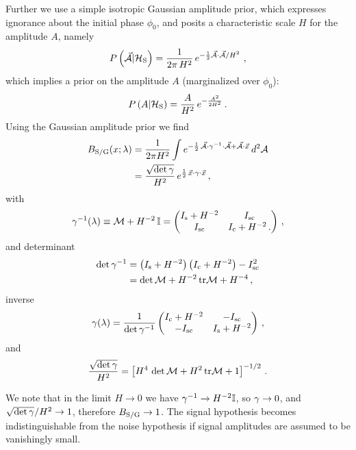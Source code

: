 \documentclass[aps,prd,onecolumn,notitlepage,nofootinbib,superscriptaddress,altaffilletter,floatfix]{revtex4-1}
\begin{document}
Further we use a simple isotropic Gaussian amplitude prior, which expresses ignorance about the initial phase $\phi_0$, and posits a characteristic
scale $H$ for the amplitude $A$, namely
\begin{equation}
  \label{eq:22}
  P\left(\vec{\mathcal{A}}|\mathcal{H}_{\mathrm{S}}\right) = \frac{1}{2\pi\,H^2}\,e^{-\frac{1}{2}{\vec{\mathcal{A}}\cdot\vec{\mathcal{A}}}/H^2}\,\,,
\end{equation}
which implies a prior on the amplitude $A$ (marginalized over $\phi_0$):
\begin{equation}
  \label{eq:28}
  P\left(A|\mathcal{H}_{\mathrm{S}}\right) = \frac{A}{H^2}\,e^{-\frac{A^2}{2H^2}}\,.
\end{equation}
Using the Gaussian amplitude prior we find
\begin{align}
  \label{eq:29}
  B_{\mathrm{S/G}}(x;\lambda) &= \frac{1}{2\pi H^2}\int e^{-\frac{1}{2}\,\vec{\mathcal{A}}\cdot\gamma^{-1}\cdot\vec{\mathcal{A}} + \vec{\mathcal{A}}\cdot\vec{x}}\,d^2\mathcal{A}\\
  &= \frac{\sqrt{\det\gamma}}{H^2}\, e^{\frac{1}{2}\,\vec{x}\cdot\gamma\cdot\vec{x}}\,,
\end{align}
with
\begin{equation}
  \label{eq:25}
  \gamma^{-1}(\lambda) \equiv \mathcal{M} + H^{-2}\,\mathbb{I} =
  \begin{pmatrix}
    I_{\mathrm{s}} + H^{-2} & I_{\mathrm{sc}} \\
    I_{\mathrm{sc}}        & I_{\mathrm{c}} + H^{-2}\,.
  \end{pmatrix}\,,
\end{equation}
and determinant
\begin{align}
  \label{eq:39}
  \det\gamma^{-1} &= \left(I_{\mathrm{s}} + H^{-2}\right)\left(I_{\mathrm{c}}+H^{-2}\right) - I_{\mathrm{sc}}^2\\
  &=\det\mathcal{M} + H^{-2}\,\mathrm{tr}\mathcal{M} + H^{-4}\,,
\end{align}
inverse
\begin{equation}
  \label{eq:41}
  \gamma(\lambda) = \frac{1}{\det\gamma^{-1}}
  \begin{pmatrix}
    I_{\mathrm{c}} + H^{-2} & -I_{\mathrm{sc}} \\
    -I_{\mathrm{sc}}        & I_{\mathrm{s}} + H^{-2}
  \end{pmatrix}\,,
\end{equation}
and
\begin{equation}
  \label{eq:40}
  \frac{\sqrt{\det\gamma}}{H^2} = \left[H^4\,\det\mathcal{M} + H^2\,\mathrm{tr}\mathcal{M} + 1\right]^{-1/2}\,.
\end{equation}

We note that in the limit $H\rightarrow0$ we have $\gamma^{-1}\rightarrow H^{-2}\mathbb{I}$, so $\gamma\rightarrow0$, and
$\sqrt{\det\gamma}/H^2\rightarrow 1$, therefore $B_{\mathrm{S/G}}\rightarrow 1$.
The signal hypothesis becomes indistinguishable from the noise hypothesis if signal amplitudes are assumed to be vanishingly small.
\end{document}
